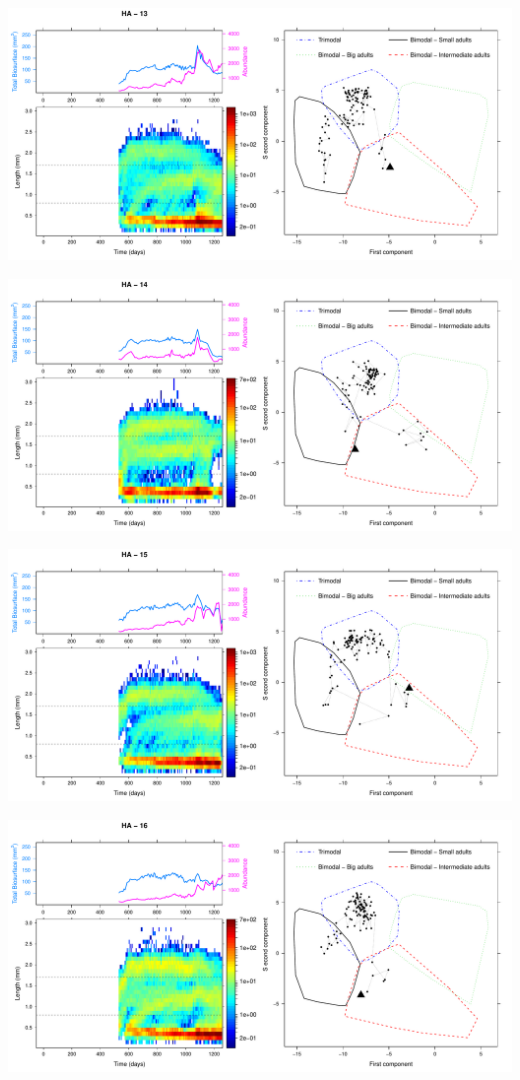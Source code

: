\includegraphics[height=0.33\textheight]{3-1_ChapExp1/Fig/HA-21-13}

\includegraphics[height=0.33\textheight]{3-1_ChapExp1/Fig/HA-21-14}

\includegraphics[height=0.33\textheight]{3-1_ChapExp1/Fig/HA-21-15}

\includegraphics[height=0.33\textheight]{3-1_ChapExp1/Fig/HA-21-16}

